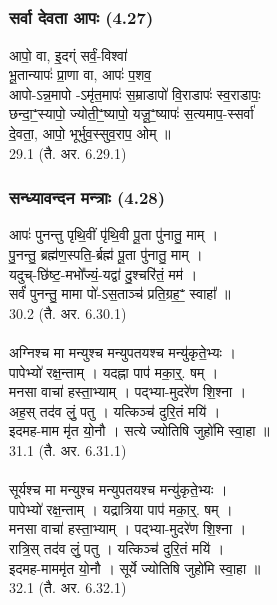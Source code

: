 \subsection{}
\subsubsection{सर्वा देवता आपः (4.27)}
आपो॒ वा, इ॒दग्ं सर्वं॒-विश्वा॑ \\
भू॒तान्यापः॑ प्रा॒णा वा, आपः॑ प॒शव॒\\
आपो-ऽन्न॒मापो -ऽमृ॑त॒मापः॑ स॒म्राडापो॑ वि॒राडापः॑ स्व॒राडापः॒\\
छन्दा॒ꣲ॒स्यापो॒ ज्योती॒ꣲ॒ष्यापो॒ यजू॒ꣲ॒ष्यापः॑ स॒त्यमाप॒-स्सर्वा॑\\
दे॒वता॒, आपो॒ भूर्भुव॒स्सुव॒राप॒ ओम् ॥ \\
29.1 (तै. अर. 6.29.1)

\subsubsection{सन्ध्यावन्दन मन्त्राः (4.28)}
आपः॑ पुनन्तु पृथि॒वीं पृ॑थि॒वी पू॒ता पु॑नातु॒ माम् ।\\
पु॒नन्तु॒ ब्रह्म॑ण॒स्पति॒-र्ब्रह्म॑ पू॒ता पु॑नातु॒ माम् ।\\
यदुच्-छि॑ष्ट॒-मभो᳚ज्यं॒-यद्वा॑ दु॒श्चरि॑तं॒ मम॑ ।\\
सर्वं॑ पुनन्तु॒ मामा पो॑-ऽस॒ताञ्च॑ प्रति॒ग्रह॒ꣲ॒ स्वाहा᳚ ॥\\
30.2 (तै. अर. 6.30.1)\\
\\
अग्निश्च मा मन्युश्च मन्युपतयश्च मन्यु॑कृते॒भ्यः ।\\
पापेभ्यो॑ रक्ष॒न्ताम् । यदह्ना पाप॑ मका॒र्॒. षम् ।\\
मनसा वाचा॑ हस्ता॒भ्याम् । पद्भ्या-मुदरे॑ण शि॒श्ना ।\\
अह॒स् तद॑व लुं॒ पतु । यत्किञ्च॑ दुरि॒तं मयि॑ ।\\
इदमह-माम मृ॑त यो॒नौ । सत्ये ज्योतिषि जुहो॑मि स्वा॒हा ॥ \\
31.1 (तै. अर. 6.31.1)\\
\\
सूर्यश्च मा मन्युश्च मन्युपतयश्च मन्यु॑कृते॒भ्यः ।\\
पापेभ्यो॑ रक्ष॒न्ताम् । यद्रात्रिया पाप॑ मका॒र्॒. षम् ।\\
मनसा वाचा॑ हस्ता॒भ्याम् । पद्भ्या-मुदरे॑ण शि॒श्ना ।\\
रात्रि॒स् तद॑व लुं॒ पतु । यत्किञ्च॑ दुरि॒तं मयि॑ ।\\
इदमह-माममृ॑त यो॒नौ । सूर्ये ज्योतिषि जुहो॑मि स्वा॒हा ॥ \\
32.1 (तै. अर. 6.32.1)\\

